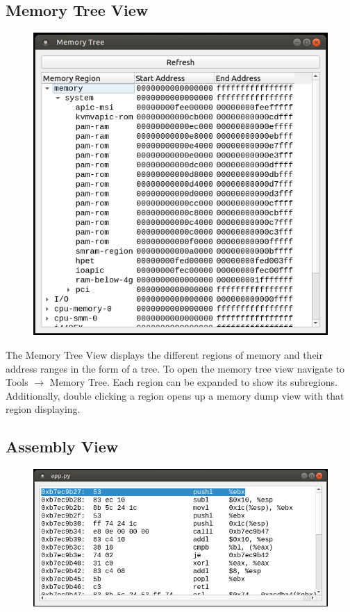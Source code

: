 \documentclass{article}
\begin{document}
\subsection{Memory Tree View}
\begin{figure}[h]
    \centering
    \includegraphics[width=.6\textwidth]{images/MemTree.PNG}
    \label{fig:memtree}
\end{figure}
The Memory Tree View displays the different regions of memory and their address ranges in the form of a tree. To open the memory tree view navigate to Tools $\rightarrow$ Memory Tree. Each region can be expanded to show its subregions. Additionally, double clicking a region opens up a memory dump view with that region displaying.
\newpage
\subsection{Assembly View}
\begin{figure}[h]
    \centering
    \includegraphics[width=.6\textwidth]{images/AssemblyView.PNG}
    \label{fig:asmview}
\end{figure}
\end{document}
